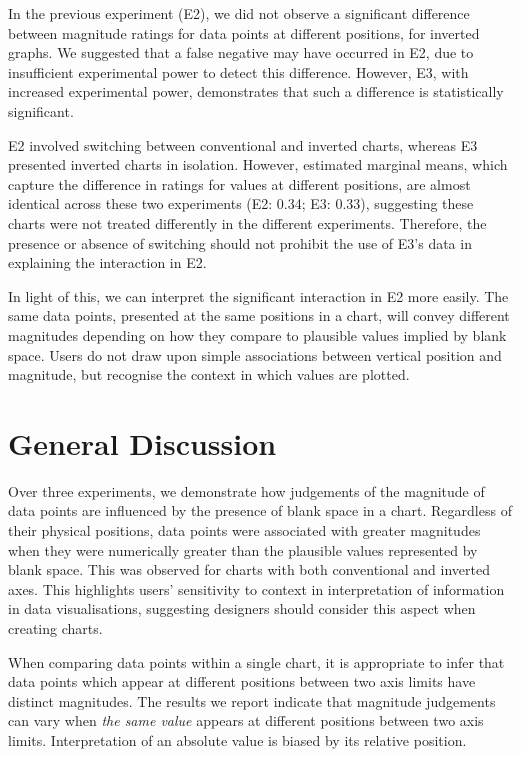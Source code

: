 \documentclass[journal]{vgtc}                %
\begin{document}
In the previous experiment (E2), we did not observe a significant difference between magnitude ratings for data points at different positions, for inverted graphs. We suggested that a false negative may have occurred in E2, due to insufficient experimental power to detect this difference. However, E3, with increased experimental power, demonstrates that such a difference is statistically significant.

E2 involved switching between conventional and inverted charts, whereas E3 presented inverted charts in isolation. However, estimated marginal means, which capture the difference in ratings for values at different positions, are almost identical across these two experiments (E2: 0.34; E3: 0.33), suggesting these charts were not treated differently in the different experiments. Therefore, the presence or absence of switching should not prohibit the use of E3's data in explaining the interaction in E2.

In light of this, we can interpret the significant interaction in E2 more easily. The same data points, presented at the same positions in a chart, will convey different magnitudes depending on how they compare to plausible values implied by blank space. Users do not draw upon simple associations between vertical position and magnitude, but recognise the context in which values are plotted.

\hypertarget{general-discussion}{%
\section{General Discussion}\label{general-discussion}}

Over three experiments, we demonstrate how judgements of the magnitude of data points are influenced by the presence of blank space in a chart. Regardless of their physical positions, data points were associated with greater magnitudes when they were numerically greater than the plausible values represented by blank space. This was observed for charts with both conventional and inverted axes. This highlights users' sensitivity to context in interpretation of information in data visualisations, suggesting designers should consider this aspect when creating charts.

When comparing data points within a single chart, it is appropriate to infer that data points which appear at different positions between two axis limits have distinct magnitudes. The results we report indicate that magnitude judgements can vary when \emph{the same value} appears at different positions between two axis limits. Interpretation of an absolute value is biased by its relative position.~
\end{document}
